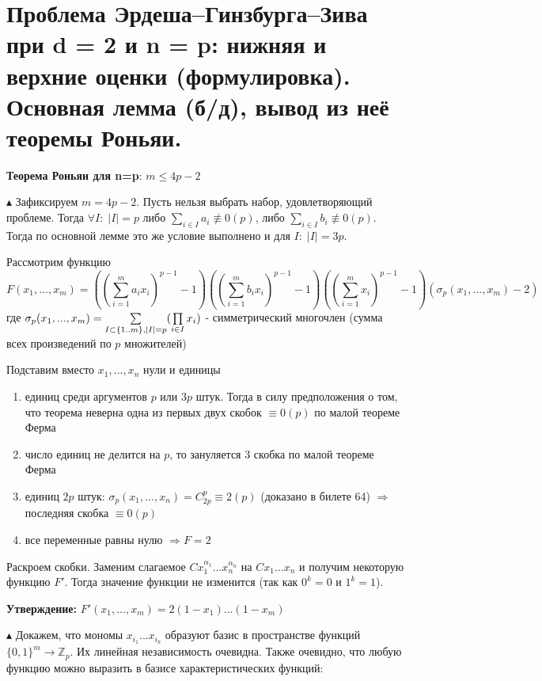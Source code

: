 \section{Проблема Эрдеша–Гинзбурга–Зива при d = 2 и n = p: нижняя и верхние оценки (формулировка). Основная лемма (б/д), вывод из неё теоремы Роньяи.}
\par \textbf{Теорема Роньяи для n=p}: $m \leq 4p-2$
\par $\blacktriangle$ Зафиксируем $m=4p-2$. Пусть нельзя выбрать набор, удовлетворяющий проблеме. Тогда $\forall I: \; |I|=p$ либо $\sum\limits_{i \in I}a_i \not\equiv 0(p)$, либо $\sum\limits_{i \in I}b_i \not\equiv 0(p)$. Тогда по основной лемме это же условие выполнено и для $I: \; |I|=3p$.
\par Рассмотрим функцию
$$F(x_1, ..., x_m)=\left(\left(\sum_{i = 1}^m a_i x_i\right)^{p-1}-1\right)\left(\left(\sum_{i = 1}^m b_i x_i\right)^{p-1}-1\right)\left(\left(\sum_{i = 1}^m  x_i\right)^{p-1}-1\right)\left(\sigma_p(x_1, ..., x_m)-2\right)$$
где $\sigma_p(x_1, ..., x_m) = \sum\limits_{I \subset \{1..m\},\\ |I|=p}(\prod\limits_{i \in I} x_i)$ - симметрический многочлен (сумма всех произведений по $p$ множителей)
\par Подставим вместо $x_1, ..., x_n$ нули и единицы
\begin{enumerate}
    \item единиц среди аргументов $p$ или $3p$ штук. Тогда в силу предположения о том, что теорема неверна одна из первых двух скобок $\equiv 0(p)$ по малой теореме Ферма
    \item число единиц не делится на $p$, то зануляется 3 скобка по малой теореме Ферма
    \item единиц $2p$ штук: $\sigma_p(x_1, ..., x_n) = C_{2p}^p \equiv 2 (p)$ (доказано в билете 64) $\Rightarrow$ последняя скобка $\equiv 0(p)$
    \item все переменные равны нулю $\Rightarrow F=2$ 
\end{enumerate}
\par Раскроем скобки. Заменим слагаемое $C x_1^{\alpha_1}...x_n^{\alpha_n}$ на $C x_1...x_n$ и получим некоторую функцию $F'$. Тогда значение функции не изменится (так как $0^k=0$ и $1^k=1$). 
\par \textbf{Утверждение: } $F'(x_1, ..., x_m)=2(1-x_1)...(1-x_m)$
\par $\blacktriangle$ Докажем, что мономы $x_{i_1}...x_{i_k}$ образуют базис в пространстве функций $\{0, 1\}^m \rightarrow \mathbb{Z}_p$. Их линейная независимость очевидна. Также очевидно, что любую функцию можно выразить в базисе характеристических функций:
